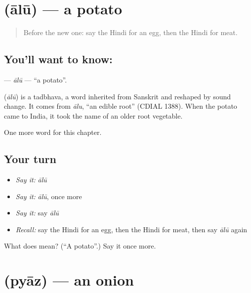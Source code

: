 \section[\texorpdfstring{\hi{आलू} (ālū)}{आलू (ālū)}]{ (ālū) — a potato}

\label{lesson:HI-C137-alu}



\begin{quote}
Before the new one: say the Hindi for an egg, then the Hindi for meat.
\end{quote}

\subsection*{You'll want to know: }
\textbf{} — \emph{ālū} — \textquotedblleft{}a potato\textquotedblright{}.

\begin{cousinweb}
\textbf{} (\emph{ālū}) is a tadbhava, a word inherited from Sanskrit and reshaped by sound change. It comes from \emph{ālu}, \textquotedblleft{}an edible root\textquotedblright{} (CDIAL 1388). When the potato came to India, it took the name of an older root vegetable.
\end{cousinweb}

\begin{grammarlens}[title={What you've built}]
One more word for this chapter.
\end{grammarlens}

\subsection*{Your turn}
\begin{itemize}
\raggedright
  \item \emph{Say it:} \emph{ālū}
  \item \emph{Say it:} \emph{ālū}, once more
  \item \emph{Say it:} say \emph{ālū}
  \item \emph{Recall:} say the Hindi for an egg, then the Hindi for meat, then say \emph{ālū} again
\end{itemize}

\begin{tcolorbox}[breakable,colback=teal!4,colframe=teal!35!black,title={Before you move on}]
What does  mean? (\textquotedblleft{}A potato\textquotedblright{}.) Say it once more.
\end{tcolorbox}
\section[\texorpdfstring{\hi{प्याज़} (pyāz)}{प्याज़ (pyāz)}]{ (pyāz) — an onion}

